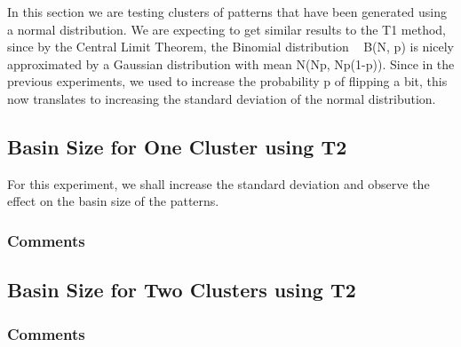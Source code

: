 In this section we are testing clusters of patterns that have been generated using a normal distribution. We are expecting to get similar results to the T1 method, since by the Central Limit Theorem, the Binomial distribution ~ B(N, p) is nicely approximated by a Gaussian distribution with mean N(Np, Np(1-p)). Since in the previous experiments, we used to increase the probability p of flipping a bit, this now translates to increasing the standard deviation of the normal distribution.


\subsection{Basin Size for One Cluster using T2}

For this experiment, we shall increase the standard deviation and observe the effect on the basin size of the patterns.


\subsubsection{Comments}

\subsection{Basin Size for Two Clusters using T2}

\subsubsection{Comments}
\\




\let\psuper\undefined
\let\prandom\undefined
